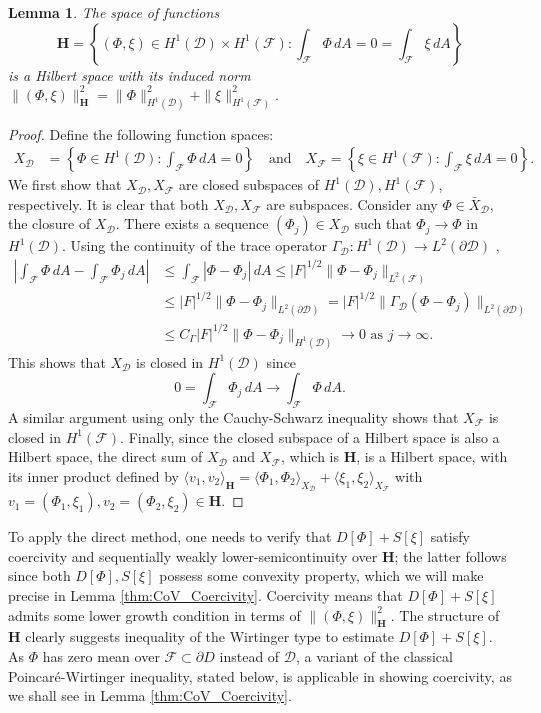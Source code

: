 \documentclass[letterpaper, 12pt]{amsart}
\newtheorem{lemma}[definition]{Lemma}
\renewcommand{\H}{\mathbf{H}}
\newcommand{\D}{\mathcal{D}}
\newcommand{\F}{\mathcal{F}}
\begin{document}
\begin{lemma}\label{thm:CoV_DirectSum}
The space of functions
\[ \H = \left\{(\Phi,\xi)\in H^1(\D)\times H^1(\F)\colon \int_\F \Phi\, dA = 0 = \int_\F \xi\, dA\right\} \]
is a Hilbert space with its induced norm
$ \|(\Phi,\xi)\|_\H^2 = \|\Phi\|_{H^1(\D)}^2 + \|\xi\|_{H^1(\F)}^2. $
\end{lemma}
\begin{proof}
Define the following function spaces: 
\begin{align*}
X_\D & = \left\{\Phi\in H^1(\D)\colon \int_\F \Phi\, dA=0\right\} 
\quad \textrm{and} \quad 
X_\F  = \left\{\xi\in H^1(\F)\colon \int_\F \xi\, dA = 0\right\}.
\end{align*}
We first show that $X_\D, X_\F$ are closed subspaces of $H^1(\D), H^1(\F)$, respectively. It is clear that both $X_\D, X_\F$ are subspaces. Consider any $\Phi\in\bar X_\D$, the closure of $X_\D$. There exists a sequence $(\Phi_j)\in X_\D$ such that $\Phi_j\longrightarrow\Phi$ in $H^1(\D)$. Using the continuity of the trace operator $\Gamma_\D\colon H^1(\D)\longrightarrow L^2(\partial\D)$ \cite{Evans:2010aa},
\begin{align*}
\left|\int_\F\Phi\, dA - \int_\F\Phi_j\, dA\right|& \le \int_\F |\Phi-\Phi_j|\, dA  \le |F|^{1/2}\|\Phi-\Phi_j\|_{L^2(\F)}\\
& \le |F|^{1/2}\|\Phi-\Phi_j\|_{L^2(\partial\D)} = |F|^{1/2}\|\Gamma_\D(\Phi-\Phi_j)\|_{L^2(\partial\D)}\\
& \le C_\Gamma |F|^{1/2}\|\Phi-\Phi_j\|_{H^1(\D)}\longrightarrow 0\textrm{ as }j\longrightarrow\infty.
\end{align*}
This shows that $X_\D$ is closed in $H^1(\D)$ since
\[ 0=\int_\F\Phi_j\, dA \longrightarrow \int_\F\Phi\, dA. \]
A similar argument using only the Cauchy-Schwarz inequality shows that $X_\F$ is closed in $H^1(\F)$. Finally, since the closed subspace of a Hilbert space is also a Hilbert space, the direct sum of $X_\D$ and $X_\F$, which is $\H$, is a Hilbert space, with its inner product defined by
$ \langle v_1,v_2\rangle_\H = \langle\Phi_1,\Phi_2\rangle_{X_\D} + \langle\xi_1,\xi_2\rangle_{X_\F}$
with $v_1=(\Phi_1,\xi_1), v_2=(\Phi_2,\xi_2)\in\H$.
\end{proof}


To apply the direct method, one needs to verify that $D[\Phi]+S[\xi]$ satisfy coercivity and sequentially weakly lower-semicontinuity over $\H$; the latter follows since both $D[\Phi], S[\xi]$ possess some convexity property, which we will make precise in Lemma \ref{thm:CoV_Coercivity}. Coercivity means that $D[\Phi]+S[\xi]$ admits some lower growth condition in terms of $\|(\Phi,\xi)\|_{\H}^2$. The structure of $\H$ clearly suggests inequality of the Wirtinger type to estimate $D[\Phi]+S[\xi]$. As $\Phi$ has zero mean over $\F\subset\partial D$ instead of $\D$, a variant of the classical Poincar\'e-Wirtinger inequality, stated below, is applicable in showing coercivity, as we shall see in Lemma \ref{thm:CoV_Coercivity}.
\end{document}

